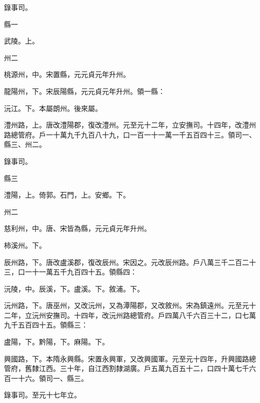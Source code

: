 \begin{pinyinscope}
 錄事司。



 縣一



 武陵。上。



 州二



 桃源州，中。宋置縣，元元貞元年升州。



 龍陽州，下。宋辰陽縣，元元貞元年升州。領一縣：



 沅江。下。本屬朗州。後來屬。



 澧州路，上。唐改澧陽郡，復改澧州。元至元十二年，立安撫司。十四年，改澧州路總管府。戶一十萬九千九百八十九，口一百一十一萬一千五百四十三。領司一、縣三、州二。



 錄事司。



 縣三



 澧陽，上。倚郭。石門，上。安鄉。下。



 州二



 慈利州，中。唐、宋皆為縣，元元貞元年升州。



 柿溪州。下。



 辰州路，下。唐改盧溪郡，復改辰州。宋因之。元改辰州路。戶八萬三千二百二十三，口一十一萬五千九百四十五。領縣四：



 沅陵，中。辰溪，下。盧溪。下。敘浦。下。



 沅州路，下。唐巫州，又改沅州，又為潭陽郡，又改敘州。宋為鎮遠州。元至元十二年，立沅州安撫司。十四年，改沅州路總管府。戶四萬八千六百三十二，口七萬九千五百四十五。領縣三：



 盧陽，下。黔陽，下。麻陽。下。



 興國路，下。本隋永興縣。宋置永興軍，又改興國軍。元至元十四年，升興國路總管府，舊隸江西。三十年，自江西割隸湖廣。戶五萬九百五十二，口四十萬七千六百一十六。領司一、縣三。



 錄事司。至元十七年立。




\end{pinyinscope}
